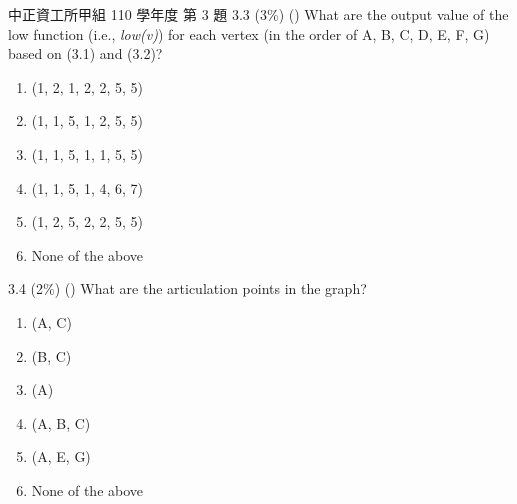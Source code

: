 \begin{pastexam}[label={px:con-4}]{中正資工所甲組 110 學年度 第 3 題}
3.3 (3\%) (\quad) What are the output value of the low function (i.e., \textit{low(v)}) for each vertex (in the order of A, B, C, D, E, F, G) based on (3.1) and (3.2)?
\begin{enumerate}[label=(\alph*)]
\item (1, 2, 1, 2, 2, 5, 5)
\item (1, 1, 5, 1, 2, 5, 5)
\item (1, 1, 5, 1, 1, 5, 5)
\item (1, 1, 5, 1, 4, 6, 7)
\item (1, 2, 5, 2, 2, 5, 5)
\item None of the above
\end{enumerate}

3.4 (2\%) (\quad) What are the articulation points in the graph?
\begin{enumerate}[label=(\alph*)]
\item (A, C)
\item (B, C)
\item (A)
\item (A, B, C)
\item (A, E, G)
\item None of the above
\end{enumerate}
\end{pastexam}

